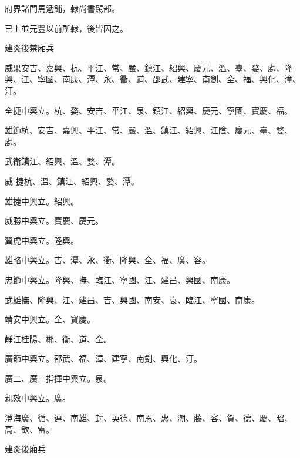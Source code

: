 \begin{pinyinscope}
 府界諸門馬遞鋪，隸尚書駕部。



 已上並元豐以前所隸，後皆因之。



 建炎後禁廂兵



 威果安吉、嘉興、杭、平江、常、嚴、鎮江、紹興、慶元、溫、臺、婺、處、隆興、江、寧國、南康、潭、永、衢、道、邵武、建寧、南劍、全、福、興化、漳、汀。



 全捷中興立。杭、婺、安吉、平江、泉、鎮江、紹興、慶元、寧國、寶慶、福。



 雄節杭、安吉、嘉興、平江、常、嚴、溫、鎮江、紹興、江陰、慶元、臺、婺、處。



 武衛鎮江、紹興、溫、婺、潭。



 威
 捷杭、溫、鎮江、紹興、婺、潭。



 雄捷中興立。紹興。



 威勝中興立。寶慶、慶元。



 翼虎中興立。隆興。



 雄略中興立。吉、潭、永、衢、隆興、全、福、廣、容。



 忠節中興立。隆興、撫、臨江、寧國、江、建昌、興國、南康。



 武雄撫、隆興、江、建昌、吉、興國、南安、袁、臨江、寧國、南康。



 靖安中興立。全、寶慶。



 靜江桂陽、郴、衡、道、全。



 廣節中興立。邵武、福、漳、建寧、南劍、興化、汀。



 廣二、廣三指揮中興立。泉。



 親效中興立。廣。



 澄海廣、循、連、南雄、封、英德、南恩、惠、潮、藤、容、賀、德、慶、昭、高、欽、雷。



 建炎後廂兵




\end{pinyinscope}
